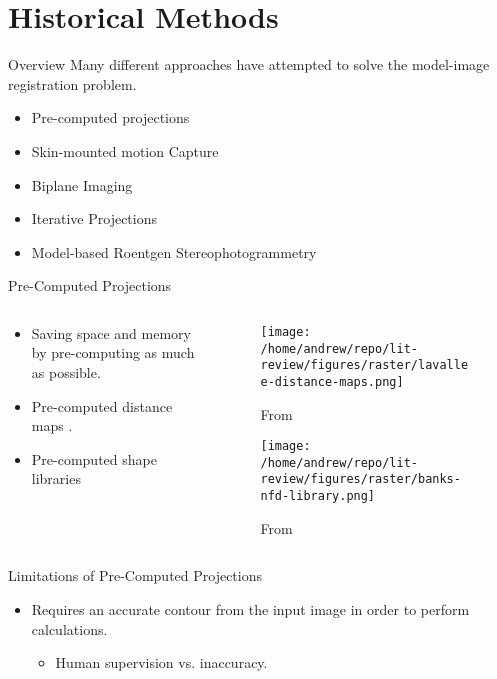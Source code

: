 \documentclass[presentation, aspectratio=1610]{beamer}
\begin{document}
\section{Historical Methods}
\label{sec:orgafe0075}
\begin{frame}[label={sec:orgbb165da}]{Overview}
Many different approaches have attempted to solve the model-image registration problem.
\begin{itemize}
\item Pre-computed projections
\item Skin-mounted motion Capture
\item Biplane Imaging
\item Iterative Projections
\item Model-based Roentgen Stereophotogrammetry
\end{itemize}
\end{frame}
\begin{frame}[label={sec:orgecd6676}]{Pre-Computed Projections}
\begin{columns}
\begin{column}{0.5\columnwidth}
\begin{itemize}
\item Saving space and memory by pre-computing as much as possible.
\item Pre-computed distance maps \autocites{zuffiModelbasedMethodReconstruction1999}[][]{lavalleeRecoveringPositionOrientation1995}.
\item Pre-computed shape libraries \autocite{banksAccurateMeasurementThreedimensional1996}
\end{itemize}
\end{column}
\begin{column}{0.6\columnwidth}
\begin{figure}[htbp]
\centering
\texttt{[image: /home/andrew/repo/lit-review/figures/raster/lavallee-distance-maps.png]}
\caption{From \autocite{lavalleeRecoveringPositionOrientation1995}}
\end{figure}
\vspace{-0.25in}
\begin{figure}[htbp]
\centering
\texttt{[image: /home/andrew/repo/lit-review/figures/raster/banks-nfd-library.png]}
\caption{From \autocite{banksAccurateMeasurementThreedimensional1996}}
\end{figure}
\end{column}
\end{columns}
\end{frame}
\begin{frame}[label={sec:orgf9944d6}]{Limitations of Pre-Computed Projections}
\begin{itemize}
\item Requires an accurate contour from the input image in order to perform calculations.
\begin{itemize}
\item Human supervision vs. inaccuracy.
\end{itemize}
\end{itemize}
\end{frame}
\end{document}

